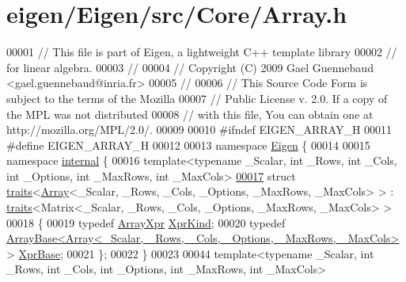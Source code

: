 \hypertarget{eigen_2_eigen_2src_2_core_2_array_8h_source}{}\section{eigen/\+Eigen/src/\+Core/\+Array.h}
\label{eigen_2_eigen_2src_2_core_2_array_8h_source}

\begin{DoxyCode}
00001 \textcolor{comment}{// This file is part of Eigen, a lightweight C++ template library}
00002 \textcolor{comment}{// for linear algebra.}
00003 \textcolor{comment}{//}
00004 \textcolor{comment}{// Copyright (C) 2009 Gael Guennebaud <gael.guennebaud@inria.fr>}
00005 \textcolor{comment}{//}
00006 \textcolor{comment}{// This Source Code Form is subject to the terms of the Mozilla}
00007 \textcolor{comment}{// Public License v. 2.0. If a copy of the MPL was not distributed}
00008 \textcolor{comment}{// with this file, You can obtain one at http://mozilla.org/MPL/2.0/.}
00009 
00010 \textcolor{preprocessor}{#ifndef EIGEN\_ARRAY\_H}
00011 \textcolor{preprocessor}{#define EIGEN\_ARRAY\_H}
00012 
00013 \textcolor{keyword}{namespace }\hyperlink{namespace_eigen}{Eigen} \{
00014 
00015 \textcolor{keyword}{namespace }\hyperlink{namespaceinternal}{internal} \{
00016 \textcolor{keyword}{template}<\textcolor{keyword}{typename} \_Scalar, \textcolor{keywordtype}{int} \_Rows, \textcolor{keywordtype}{int} \_Cols, \textcolor{keywordtype}{int} \_Options, \textcolor{keywordtype}{int} \_MaxRows, \textcolor{keywordtype}{int} \_MaxCols>
\hyperlink{struct_eigen_1_1internal_1_1traits_3_01_array_3_01___scalar_00_01___rows_00_01___cols_00_01___ope9eba6bf714e124241d092a6dc222cb7}{00017} \textcolor{keyword}{struct }\hyperlink{struct_eigen_1_1internal_1_1traits}{traits}<\hyperlink{group___core___module_class_eigen_1_1_array}{Array}<\_Scalar, \_Rows, \_Cols, \_Options, \_MaxRows, \_MaxCols> > : 
      \hyperlink{struct_eigen_1_1internal_1_1traits}{traits}<Matrix<\_Scalar, \_Rows, \_Cols, \_Options, \_MaxRows, \_MaxCols> >
00018 \{
00019   \textcolor{keyword}{typedef} \hyperlink{struct_eigen_1_1_array_xpr}{ArrayXpr} \hyperlink{struct_eigen_1_1_array_xpr}{XprKind};
00020   \textcolor{keyword}{typedef} \hyperlink{group___core___module_class_eigen_1_1_array_base}{ArrayBase<Array<\_Scalar, \_Rows, \_Cols, \_Options, \_MaxRows, \_MaxCols>}
       > \hyperlink{group___core___module_class_eigen_1_1_array_base}{XprBase};
00021 \};
00022 \}
00023 
00044 \textcolor{keyword}{template}<\textcolor{keyword}{typename} \_Scalar, \textcolor{keywordtype}{int} \_Rows, \textcolor{keywordtype}{int} \_Cols, \textcolor{keywordtype}{int} \_Options, \textcolor{keywordtype}{int} \_MaxRows, \textcolor{keywordtype}{int} \_MaxCols>

\end{DoxyCode}
